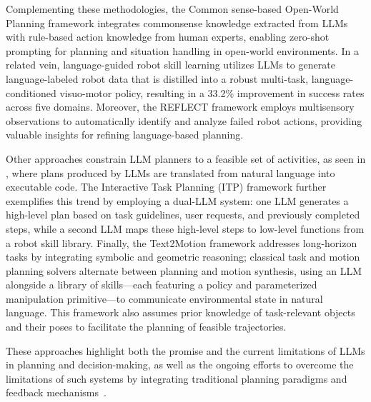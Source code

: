 Complementing these methodologies, the Common sense-based Open-World Planning framework \cite{Ding_2023} integrates commonsense knowledge extracted from LLMs with rule-based action knowledge from human experts, enabling zero-shot prompting for planning and situation handling in open-world environments. In a related vein, language-guided robot skill learning \cite{ha2023scaling} utilizes LLMs to generate language-labeled robot data that is distilled into a robust multi-task, language-conditioned visuo-motor policy, resulting in a 33.2\% improvement in success rates across five domains. Moreover, the REFLECT framework \cite{liu2023reflect} employs multisensory observations to automatically identify and analyze failed robot actions, providing valuable insights for refining language-based planning.

Other approaches constrain LLM planners to a feasible set of activities, as seen in \cite{10342169}, where plans produced by LLMs are translated from natural language into executable code. The Interactive Task Planning (ITP) framework \cite{li2025interactive} further exemplifies this trend by employing a dual-LLM system: one LLM generates a high-level plan based on task guidelines, user requests, and previously completed steps, while a second LLM maps these high-level steps to low-level functions from a robot skill library. Finally, the Text2Motion framework \cite{Lin_2023} addresses long-horizon tasks by integrating symbolic and geometric reasoning; classical task and motion planning solvers alternate between planning and motion synthesis, using an LLM alongside a library of skills—each featuring a policy and parameterized manipulation primitive—to communicate environmental state in natural language. This framework also assumes prior knowledge of task-relevant objects and their poses to facilitate the planning of feasible trajectories.

These approaches highlight both the promise and the current limitations of LLMs in planning and decision-making, as well as the ongoing efforts to overcome the limitations of such systems by integrating traditional planning paradigms and feedback mechanisms~\cite{kambhampati2024position}.


